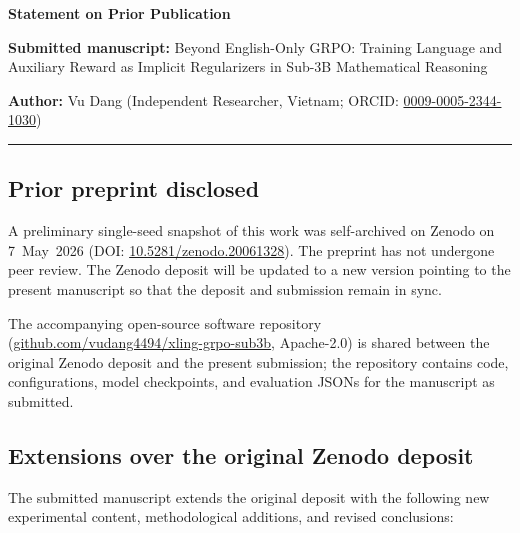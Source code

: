 \documentclass[11pt]{article}
\begin{document}
\begin{center}
\Large\textbf{Statement on Prior Publication}
\end{center}

\vspace{1em}

\noindent\textbf{Submitted manuscript:} Beyond English-Only GRPO:
Training Language and Auxiliary Reward as Implicit Regularizers in
Sub-3B Mathematical Reasoning

\noindent\textbf{Author:} Vu Dang (Independent Researcher, Vietnam;
ORCID: \href{https://orcid.org/0009-0005-2344-1030}{0009-0005-2344-1030})

\vspace{1em}\hrule\vspace{1em}

\subsection*{Prior preprint disclosed}

A preliminary single-seed snapshot of this work was self-archived on
Zenodo on 7~May~2026 (DOI:
\href{https://doi.org/10.5281/zenodo.20061328}%
{10.5281/zenodo.20061328}). The preprint has not undergone peer review.
The Zenodo deposit will be updated to a new version pointing to the
present manuscript so that the deposit and submission remain in sync.

The accompanying open-source software repository
(\href{https://github.com/vudang4494/xling-grpo-sub3b}%
{github.com/vudang4494/xling-grpo-sub3b}, Apache-2.0) is shared between
the original Zenodo deposit and the present submission; the repository
contains code, configurations, model checkpoints, and evaluation
JSONs for the manuscript as submitted.

\vspace{1em}

\subsection*{Extensions over the original Zenodo deposit}

The submitted manuscript extends the original deposit with the
following new experimental content, methodological additions, and
revised conclusions:
\end{document}
